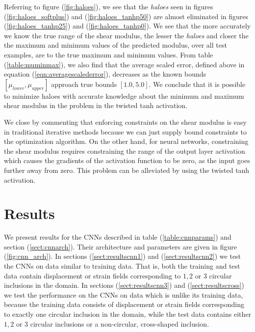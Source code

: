 \documentclass[12pt]{article}
\begin{document}
Referring to figure (\ref{fig:haloes}), we see that the \textit{haloes} seen in figures (\ref{fig:haloes_softplus}) and (\ref{fig:haloes_tanhp50}) are almost eliminated in figures (\ref{fig:haloes_tanhp25}) and (\ref{fig:haloes_tanhp0}). We see that the more accurately we know the true range of the shear modulus, the lesser the \textit{haloes} and closer the the maximum and minimum values of the predicted modulus, over all test examples, are to the true maximum and minimum values. From table (\ref{table:muminmax}), we also find that the average scaled error, defined above in equation (\ref{eqn:averagescalederror}), decreases as the known bounds $[\mu_{lower},\mu_{upper}]$ approach true bounds $[1.0,5.0]$. We conclude that it is possible to minimize haloes with accurate knowledge about the minimum and maximum shear modulus in the problem in the twisted tanh activation.

We close by commenting that enforcing constraints on the shear modulus is easy in traditional iterative methods because we can just supply bound constraints to the optimization algorithm. On the other hand, for neural networks, constraining the shear modulus requires constraining the range of the output layer activation which causes the gradients of the activation function to be zero, as the input goes further away from zero. This problem can be alleviated by using the twisted tanh activation.
% 
%
\section{Results}
We present results for the CNNs described in table (\ref{table:cnnparams}) and section (\ref{sect:cnnarch}). Their architecture and parameters are given in figure (\ref{fig:cnn_arch}). In sections (\ref{sect:resultscnn1}) and (\ref{sect:resultscnn2}) we test the CNNs on data similar to training data. That is, both the training and test data contain displacement or strain fields corresponding to $1,2$ or $3$ circular inclusions in the domain. In sections (\ref{sect:resultscnn3}) and (\ref{sect:resultscross}) we test the performance on the CNNs on data which is unlike its training data, because the training data consists of displacement or strain fields corresponding to exactly one circular inclusion in the domain, while the test data contains either $1,2$ or $3$ circular inclusions or a non-circular, cross-shaped inclusion. 
\end{document}
